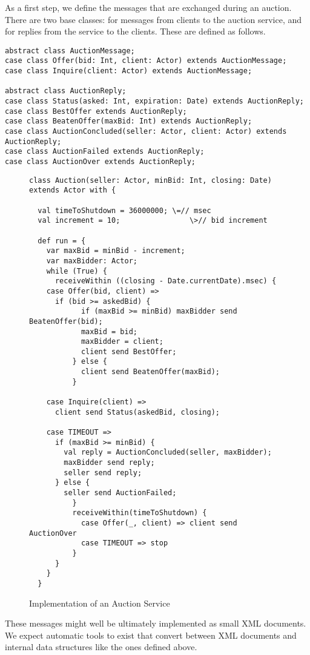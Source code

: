 \documentclass[11pt]{report}
\begin{document}
As a first step, we define the messages that are exchanged during
an auction. There are two base classes: \verb@AuctionMessage@ for messages
from clients to the auction service, and \verb@AuctionReply@ for
replies from the service to the clients. These are defined as follows.
\begin{verbatim}
abstract class AuctionMessage;
case class Offer(bid: Int, client: Actor) extends AuctionMessage;
case class Inquire(client: Actor) extends AuctionMessage;

abstract class AuctionReply;
case class Status(asked: Int, expiration: Date) extends AuctionReply;
case class BestOffer extends AuctionReply;
case class BeatenOffer(maxBid: Int) extends AuctionReply;
case class AuctionConcluded(seller: Actor, client: Actor) extends AuctionReply;
case class AuctionFailed extends AuctionReply;
case class AuctionOver extends AuctionReply;
\end{verbatim}

\begin{figure}[h]
\begin{verbatim}
class Auction(seller: Actor, minBid: Int, closing: Date) extends Actor with {

  val timeToShutdown = 36000000; \=// msec
  val increment = 10;                \>// bid increment

  def run = {
    var maxBid = minBid - increment;
    var maxBidder: Actor;
    while (True) {
      receiveWithin ((closing - Date.currentDate).msec) {
	case Offer(bid, client) =>
	  if (bid >= askedBid) {
            if (maxBid >= minBid) maxBidder send BeatenOffer(bid);
            maxBid = bid;
            maxBidder = client;
            client send BestOffer;
          } else {
            client send BeatenOffer(maxBid);
          }

	case Inquire(client) =>
	  client send Status(askedBid, closing);

	case TIMEOUT =>
	  if (maxBid >= minBid) {
	    val reply = AuctionConcluded(seller, maxBidder);
	    maxBidder send reply;
	    seller send reply;
	  } else {
	    seller send AuctionFailed;
          }
          receiveWithin(timeToShutdown) {
            case Offer(_, client) => client send AuctionOver
            case TIMEOUT => stop
          }
      }
    }
  }
\end{verbatim}
\caption{\label{fig:simple-auction}Implementation of an Auction Service}
\end{figure}

These messages might well be ultimately implemented as small XML
documents. We expect automatic tools to exist that convert between XML
documents and internal data structures like the ones defined above.
\end{document}
